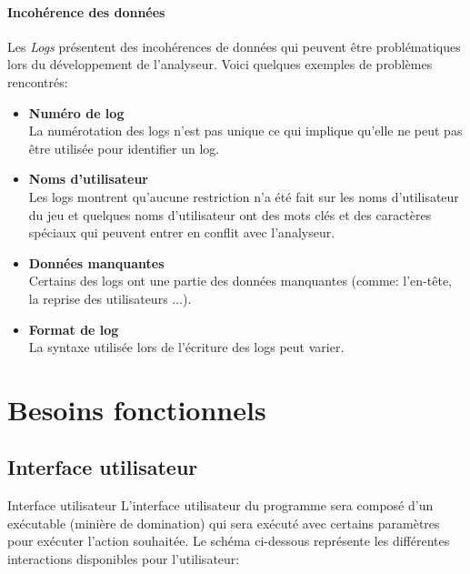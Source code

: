\documentclass{scrreprt}
\begin{document}
\subsubsection{Incohérence des données}
Les \textit{Logs} présentent des incohérences de données qui peuvent être problématiques lors du développement de l'analyseur. Voici quelques exemples de problèmes rencontrés:

\begin{itemize}
  \item \textbf{Numéro de log}\\
   La numérotation des logs n'est pas unique ce qui implique qu'elle ne peut pas être utilisée pour identifier un log.
  \item \textbf{Noms d'utilisateur}\\
    Les logs montrent qu'aucune restriction n’a été fait sur les noms d'utilisateur du jeu et quelques noms d'utilisateur ont des mots clés et des caractères spéciaux qui peuvent entrer en conflit avec l'analyseur.
   \item \textbf{Données manquantes}\\
    Certains des logs ont une partie des données manquantes (comme: l'en-tête, la reprise des utilisateurs $\ldots$).
   \item \textbf{Format de log}\\
    La syntaxe utilisée lors de l'écriture des logs peut varier.
\end{itemize}

\chapter{Besoins fonctionnels}
\iffalse
\section{Interface utilisateur}
  Interface utilisateur
L'interface utilisateur du programme sera composé d'un exécutable (minière de domination) qui sera exécuté avec certains paramètres pour exécuter l'action souhaitée. Le schéma ci-dessous représente les différentes interactions disponibles pour l'utilisateur:\\
\end{document}
